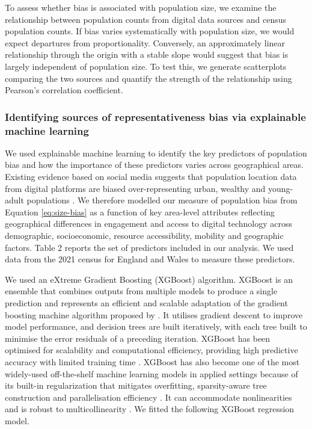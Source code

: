 \documentclass[]{rsos}%
\begin{document}
To assess whether bias is associated with population size, we
examine the relationship between population counts from digital data
sources and census population counts. If bias varies systematically with
population size, we would expect departures from proportionality.
Conversely, an approximately linear relationship through the origin with
a stable slope would suggest that bias is largely independent of
population size. To test this, we generate scatterplots comparing the
two sources and quantify the strength of the relationship using
Pearson's correlation coefficient.

\subsubsection{Identifying sources of representativeness bias via explainable machine learning}\label{sec-eml}

We used explainable machine learning to identify the key predictors of
population bias and how the importance of these predictors varies across
geographical areas. Existing evidence based on social media suggests
that population location data from digital platforms are biased
over-representing urban, wealthy and young-adult populations \citep{blumenstock2010, wesolowski13-biases, schlosser21-biases}.
We therefore modelled our measure of population bias from
Equation \ref{eq:size-bias} as a function of key area-level attributes
reflecting geographical differences in engagement and access to digital
technology across demographic, socioeconomic, resource accessibility,
mobility and geographic factors. Table 2 reports the set of predictors
included in our analysis. We used data from the 2021 census for England
and Wales to measure these predictors.

We used an eXtreme Gradient Boosting (XGBoost) algorithm. XGBoost is an
ensemble that combines outputs from multiple models to produce a single
prediction and represents an efficient and scalable adaptation of the
gradient boosting machine algorithm proposed by \citep{friedman2001a}. It
utilises gradient descent to improve model performance, and decision
trees are built iteratively, with each tree built to minimise the error
residuals of a preceding iteration. XGBoost has been optimised for
scalability and computational efficiency, providing high predictive
accuracy with limited training time \citep{chen2016, nielsen2016tree}.
XGBoost has also become one of the most widely-used off-the-shelf
machine learning models in applied settings because of its built-in
regularization that mitigates overfitting, sparsity-aware tree
construction and parallelisation efficiency \citep{chen2016}. It can
accommodate nonlinearities and is robust to multicollinearity
\citep{chen2016}. We fitted the following XGBoost regression model.
\end{document}
